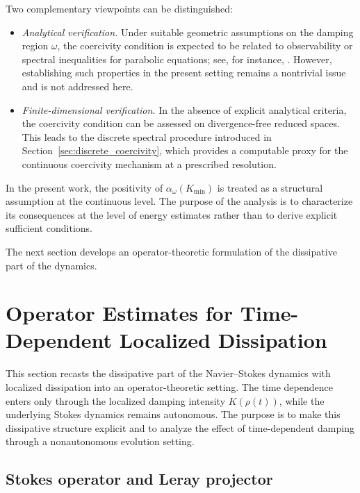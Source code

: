 \documentclass[preprint,12pt]{elsarticle}
\begin{document}
Two complementary viewpoints can be distinguished:

\begin{itemize}
\item[(i)] \emph{Analytical verification.}
Under suitable geometric assumptions on the damping region $\omega$,
the coercivity condition is expected to be related to observability or
spectral inequalities for parabolic equations; see, for instance,
\cite{LebeauRobbiano1995,apraiz2014observability}.
However, establishing such properties in the present setting remains a
nontrivial issue and is not addressed here.

\item[(ii)] \emph{Finite-dimensional verification.}
In the absence of explicit analytical criteria, the coercivity condition can be
assessed on divergence-free reduced spaces.
This leads to the discrete spectral procedure introduced in
Section~\ref{sec:discrete_coercivity}, which provides a computable proxy for the
continuous coercivity mechanism at a prescribed resolution.
\end{itemize}

In the present work, the positivity of $\alpha_\omega(K_{\min})$ is treated as
a structural assumption at the continuous level.
The purpose of the analysis is to characterize its consequences at the level of
energy estimates rather than to derive explicit sufficient conditions.

The next section develops an operator-theoretic formulation of the dissipative
part of the dynamics.

\section{Operator Estimates for Time-Dependent Localized Dissipation}
\label{sec:operator_kato}



This section recasts the dissipative part of the Navier--Stokes dynamics with
localized dissipation into an operator-theoretic setting.
The time dependence enters only through the localized damping intensity
$K(\rho(t))$, while the underlying Stokes dynamics remains autonomous.
The purpose is to make this dissipative structure explicit and to analyze the
effect of time-dependent damping through a nonautonomous evolution setting.



\subsection{Stokes operator and Leray projector}
\end{document}
